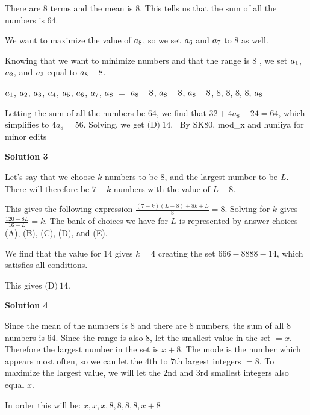 \begin{enumerate}
 There are $8$ terms and the mean is $8$. This tells us that the sum of all the numbers is $64$.

 We want to maximize the value of $a\textsubscript{8}$, so we set  $a\textsubscript{6}$ and $a\textsubscript{7}$ to $8$ as well.

 Knowing that we want to minimize numbers and that the range is $8$ , we set $a\textsubscript{1}$, $a\textsubscript{2}$, and $a\textsubscript{3}$ equal to $a\textsubscript{8} - 8$.

 {$a\textsubscript{1}$, $a\textsubscript{2}$, $a\textsubscript{3}$, $a\textsubscript{4}$, $a\textsubscript{5}$, $a\textsubscript{6}$, $a\textsubscript{7}$, $a\textsubscript{8}$} $=$ {$a\textsubscript{8} - 8$, $a\textsubscript{8} - 8$, $a\textsubscript{8} - 8$, $8$, $8$, $8$, $8$, $a\textsubscript{8}$}

 Letting the sum of all the numbers be $64$, we find that $32 + 4a_8 - 24 = 64$, which simplifies to $4a_8 = 56$. Solving, we get $\boxed{\text{(D)}\ 14 }$. ~By SK80, mod\_x and huniiya for minor edits

 



\textbf{Solution 3}

Let's say that we choose $k$ numbers to be 8, and the largest number to be $L$. There will therefore be $7-k$ numbers with the value of $L - 8$.

 This gives the following expression $\frac{(7-k)(L-8)+ 8k + L}{8} = 8$. Solving for $k$ gives $\frac{120-8L}{16-L} = k$. The bank of choices we have for $L$ is represented by answer choices (A), (B), (C), (D), and (E).

 We find that the value for $14$ gives $k = 4$ creating the set $666-8888-14$, which satisfies all conditions.

 This gives $\boxed{\text{(D)}\ 14 }$.

 



\textbf{Solution 4}

Since the mean of the numbers is $8$ and there are $8$ numbers, the sum of all $8$ numbers is $64$. Since the range is also $8$, let the smallest value in the set $= x$. Therefore the largest number in the set is $x+8$. The mode is the number which appears most often, so we can let the $4$th to $7$th largest integers $= 8$. To maximize the largest value, we will let the $2$nd and $3$rd smallest integers also equal $x$.

 In order this will be: $x, x, x, 8, 8, 8, 8, x+8$


\end{enumerate}
